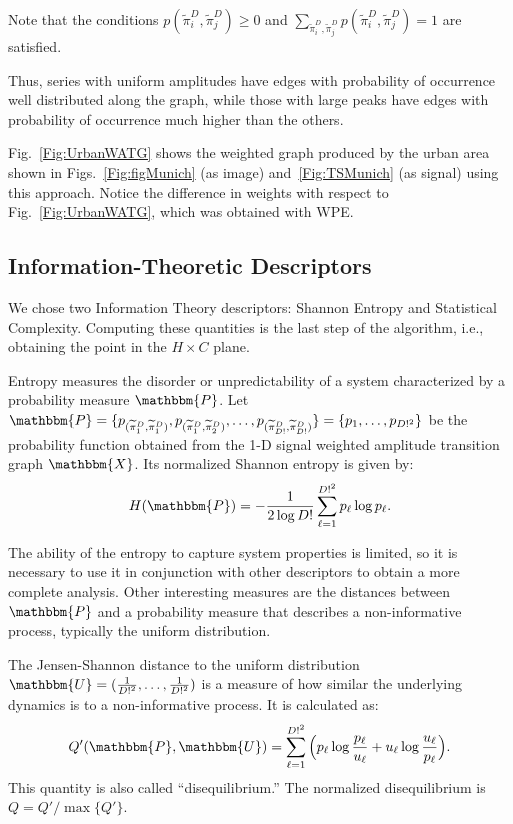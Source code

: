\documentclass[journal]{IEEEtran}
\begin{document}
Note that the conditions $p(\widetilde\pi^D_i, \widetilde\pi^D_j) \ge 0$ and $\sum_{\widetilde\pi^D_i, \widetilde\pi^D_j} p(\widetilde\pi^D_i, \widetilde\pi^D_j) = 1$ are satisfied.

Thus, series with uniform amplitudes have edges with probability of occurrence well distributed along the graph, while those with large peaks have edges with probability of occurrence much higher than the others.

Fig.~\ref{Fig:UrbanWATG} shows the weighted graph produced by the urban  area shown in Figs.~\ref{Fig:figMunich} (as image) and~\ref{Fig:TSMunich} (as signal) using this approach.
Notice the difference in weights with respect to Fig.~\ref{Fig:UrbanWATG}, which was obtained with WPE.


\subsection{Information-Theoretic Descriptors}\label{HC}

We chose two Information Theory descriptors: Shannon Entropy and Statistical Complexity.
Computing these quantities is the last step of the algorithm, i.e., obtaining the point in the $H \times C$ plane.

Entropy measures the disorder or unpredictability of a system characterized by a probability measure $\mathbbm{P}$.
Let $\mathbbm{P} = \{p_{(\widetilde\pi^D_1, \widetilde\pi^D_1)}, p_{(\widetilde\pi^D_1, \widetilde\pi^D_2)}, \dots, p_{(\widetilde\pi^D_{D!}, \widetilde\pi^D_{D!})} \} = \{p_1,\dots,p_{D!^2}\}$ be the probability function obtained from the \mbox{1-D} signal weighted amplitude transition graph $\mathbbm{X}$.
Its normalized Shannon entropy is given by:	
\begin{equation}
H(\mathbbm{P}) = -\frac1{2\log D!}\sum_{\ell=1}^{D!^2} p_{\ell} \log p_{\ell} .
\label{eq:Entropia}
\end{equation}

The ability of the entropy to capture system properties is limited, so it is necessary to use it in conjunction with other des\-criptors to obtain a more complete analysis.
Other interesting measures are the distances between $\mathbbm{P}$ and a probability measure that describes a non-informative process, typically the uniform distribution.

The Jensen-Shannon distance to the uniform distribution $\mathbbm{U} = (\frac{1}{D!^2}, \dots, \frac{1}{D!^2})$ is a measure of how similar the underlying dynamics is to a non-informative process.
It is calculated as:
\begin{equation}
Q'(\mathbbm{P}, \mathbbm{U}) = \sum_{\ell=1}^{D!^2} \Big(p_\ell \log\frac{p_\ell}{u_\ell} +
u_\ell \log\frac{u_\ell}{p_\ell}
\Big).
\end{equation}
This quantity is also called ``disequilibrium.''
The normalized disequilibrium is $ Q=Q'/\max\{Q'\}$.
\end{document}
